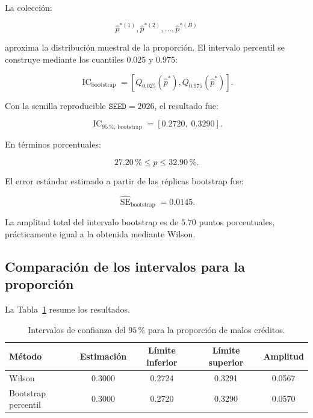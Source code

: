 La colección:

\[
\widehat{p}^{*(1)},
\widehat{p}^{*(2)},
\ldots,
\widehat{p}^{*(B)}
\]

aproxima la distribución muestral de la proporción. El intervalo
percentil se construye mediante los cuantiles \(0.025\) y \(0.975\):

\[
\operatorname{IC}_{\mathrm{bootstrap}}
=
\left[
    Q_{0.025}\left(\widehat{p}^{*}\right),
    Q_{0.975}\left(\widehat{p}^{*}\right)
\right].
\]

Con la semilla reproducible \(\texttt{SEED}=2026\), el resultado fue:

\[
\operatorname{IC}_{95\,\%,\,\mathrm{bootstrap}}
=
[0.2720,\;0.3290].
\]

En términos porcentuales:

\[
27.20\,\%
\leq
p
\leq
32.90\,\%.
\]

El error estándar estimado a partir de las réplicas bootstrap fue:

\[
\widehat{\operatorname{SE}}_{\mathrm{bootstrap}}
=
0.0145.
\]

La amplitud total del intervalo bootstrap es de \(5.70\) puntos
porcentuales, prácticamente igual a la obtenida mediante Wilson.

\subsection{Comparación de los intervalos para la proporción}

La Tabla~\ref{tab:intervalos-proporcion} resume los resultados.

\begin{table}[H]
    \centering
    \caption{Intervalos de confianza del \(95\,\%\) para la proporción
    de malos créditos.}
    \label{tab:intervalos-proporcion}

    \begin{tabular}{
        @{}
        l
        c
        c
        c
        c
        @{}
    }
        \toprule
        Método
        & Estimación
        & Límite inferior
        & Límite superior
        & Amplitud \\
        \midrule

        Wilson
        & \num{0.3000}
        & \num{0.2724}
        & \num{0.3291}
        & \num{0.0567} \\

        Bootstrap percentil
        & \num{0.3000}
        & \num{0.2720}
        & \num{0.3290}
        & \num{0.0570} \\

        \bottomrule
    \end{tabular}
\end{table}

